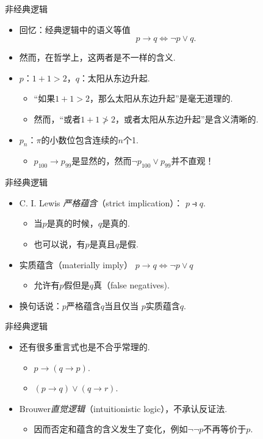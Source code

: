     
    {非经典逻辑}
    \begin{itemize}
        \item 回忆：经典逻辑中的语义等值
        \[p\to q\iff\neg p\vee q.\]
        \item 然而，在哲学上，这两者是不一样的含义.
        \item $p$：$1+1>2$，$q$：太阳从东边升起.
        \begin{itemize}
            \item “如果$1+1>2$，那么太阳从东边升起”是毫无道理的.
            \item 然而，“或者$1+1\not>2$，或者太阳从东边升起”是含义清晰的.
        \end{itemize}
        \item $p_n$：$\pi$的小数位包含连续的$n$个1.
        \begin{itemize}
            \item $p_{100}\to p_{99}$是显然的，然而$\neg p_{100}\vee p_{99}$并不直观！
        \end{itemize}
    \end{itemize}
    
    
    {非经典逻辑}
    
    \begin{itemize}
        \item C. I. Lewis \emph{严格蕴含}（strict implication）：
         $p\strictif q$.
        \begin{itemize}
            \item 
            当$p$是真的时候，$q$是真的.
            \item 也可以说，有$p$是真且$q$是假.
        \end{itemize}
            \item 实质蕴含（materially imply）
        $p\rightarrow q \iff
        \lnot {p}\vee q$
        \begin{itemize}
              \item 允许有$p$假但是$q$真（false negatives).
        \end{itemize}
        \item 换句话说：$p$严格蕴含$q$当且仅当 $p$实质蕴含$q$.
    \end{itemize}
    
    
    {非经典逻辑}
    \begin{itemize}
        \item 还有很多重言式也是不合乎常理的.
        \begin{itemize}
            \item $p\to(q\to p)$.
            \item $(p\to q)\vee (q\to r)$.
        \end{itemize}
        \item Brouwer\emph{直觉逻辑}（intuitionistic logic），不承认反证法. 
        \begin{itemize}
            \item 因而否定和蕴含的含义发生了变化，例如$\neg\neg p$不再等价于$p$.
        \end{itemize}
    \end{itemize}
    
